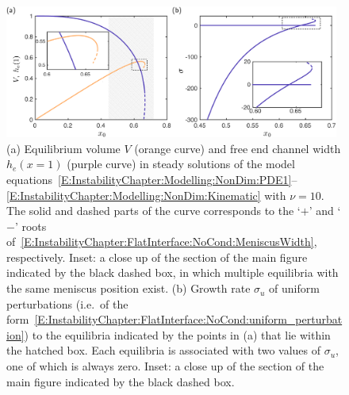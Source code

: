\begin{figure}[t]
\centering
\includegraphics[width =0.98\textwidth]{tv12_stability_nu_is_10_by_x0}
\caption{(a) Equilibrium volume  $V$ (orange curve) and free end channel width $h_e(x = 1)$ (purple curve) in steady solutions of the model equations~\eqref{E:InstabilityChapter:Modelling:NonDim:PDE1}--\eqref{E:InstabilityChapter:Modelling:NonDim:Kinematic} with $\nu = 10$. The solid and dashed parts of the curve corresponds to the `$+$' and `$-$' roots of~\eqref{E:InstabilityChapter:FlatInterface:NoCond:MeniscusWidth}, respectively. Inset: a close up of the section of the main figure indicated by the black dashed box, in which multiple equilibria with the same meniscus position exist. (b) Growth rate $\sigma_u$ of uniform perturbations (i.e.~of the form~\eqref{E:InstabilityChapter:FlatInterface:NoCond:uniform_perturbation}) to the equilibria indicated by the points in (a) that lie within the hatched box. Each equilibria is associated with two values of $\sigma_u$, one of which is always zero. Inset: a close up of the section of the main figure indicated by the black dashed box.}\label{fig:InstabilityChapter:FlatInterface:NoCond:Tv12_analogue}
\end{figure}

